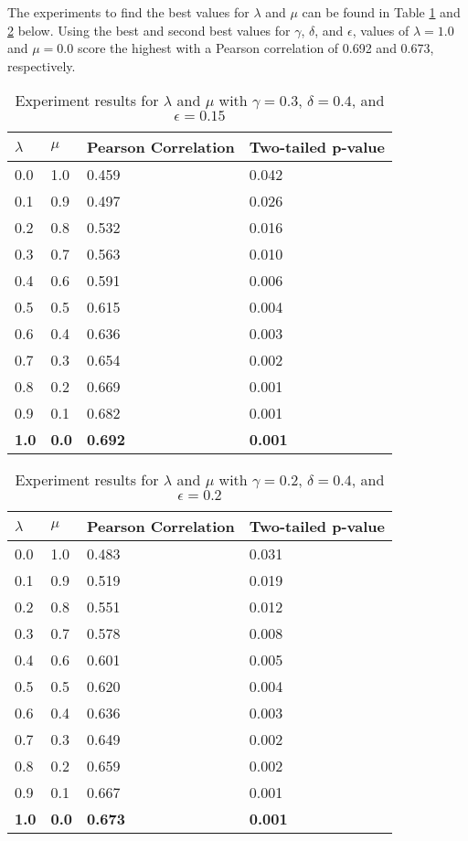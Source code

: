 \documentclass{article}
\begin{document}
The experiments to find the best values for $\lambda$ and $\mu$ can be found in Table \ref{table:lambdamuresults1} and \ref{table:lambdamuresults2} below. Using the best and second best values for $\gamma$, $\delta$, and $\epsilon$, values of $\lambda = 1.0$ and $\mu = 0.0$ score the highest with a Pearson correlation of 0.692 and 0.673, respectively. 

\begin{table}[h!]
\caption{Experiment results for $\lambda$ and $\mu$ with $\gamma = 0.3$, $\delta = 0.4$, and $\epsilon = 0.15$}
\centering
\begin{tabular}{llll}
	\toprule
	$\lambda$ & $\mu$ & Pearson Correlation & Two-tailed p-value \\
	\midrule
	0.0 & 1.0 & 0.459 & 0.042 \\
	0.1 & 0.9 & 0.497 & 0.026 \\
	0.2 & 0.8 & 0.532 & 0.016 \\
	0.3 & 0.7 & 0.563 & 0.010 \\
	0.4 & 0.6 & 0.591 & 0.006 \\
	0.5 & 0.5 & 0.615 & 0.004 \\
	0.6 & 0.4 & 0.636 & 0.003 \\
	0.7 & 0.3 & 0.654 & 0.002 \\
	0.8 & 0.2 & 0.669 & 0.001 \\
	0.9 & 0.1 & 0.682 & 0.001 \\
	\textbf{1.0} & \textbf{0.0} & \textbf{0.692} & \textbf{0.001} \\
	\bottomrule
\end{tabular}
\label{table:lambdamuresults1}
\end{table}

\begin{table}[h!]
\caption{Experiment results for $\lambda$ and $\mu$ with $\gamma = 0.2$, $\delta = 0.4$, and $\epsilon = 0.2$}
\centering
\begin{tabular}{llll}
	\toprule
	$\lambda$ & $\mu$ & Pearson Correlation & Two-tailed p-value \\
	\midrule
	0.0 & 1.0 & 0.483 & 0.031 \\
	0.1 & 0.9 & 0.519 & 0.019 \\
	0.2 & 0.8 & 0.551 & 0.012 \\
	0.3 & 0.7 & 0.578 & 0.008 \\
	0.4 & 0.6 & 0.601 & 0.005 \\
	0.5 & 0.5 & 0.620 & 0.004 \\
	0.6 & 0.4 & 0.636 & 0.003 \\
	0.7 & 0.3 & 0.649 & 0.002 \\
	0.8 & 0.2 & 0.659 & 0.002 \\
	0.9 & 0.1 & 0.667 & 0.001 \\
	\textbf{1.0} & \textbf{0.0} & \textbf{0.673} & \textbf{0.001} \\	
	\bottomrule
\end{tabular}
\label{table:lambdamuresults2}
\end{table}
\end{document}
